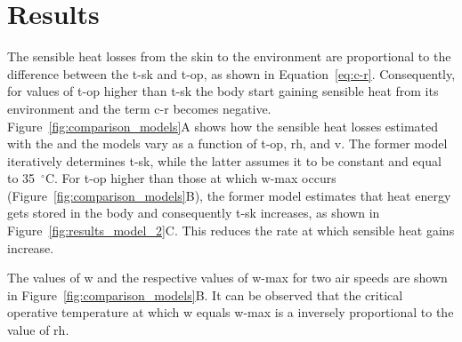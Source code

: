 

\section{Results}\label{sec:results}

The sensible heat losses from the skin to the environment are proportional to the difference between the \ac{t-sk} and \ac{t-op}, as shown in Equation~\ref{eq:c-r}.
Consequently, for values of \ac{t-op} higher than \ac{t-sk} the body start gaining sensible heat from its environment and the term \ac{c-r} becomes negative.
Figure~\ref{fig:comparison_models}A shows how the sensible heat losses estimated with the  and the  models vary as a function of \ac{t-op}, \ac{rh}, and \ac{v}.
The former model iteratively determines \ac{t-sk}, while the latter assumes it to be constant and equal to 35~$^{\circ}$C\@.
For \ac{t-op} higher than those at which \ac{w-max} occurs (Figure~\ref{fig:comparison_models}B), the former model estimates that heat energy gets stored in the body and consequently \ac{t-sk} increases, as shown in Figure~\ref{fig:results_model_2}C\@.
This reduces the rate at which sensible heat gains increase.

The values of \ac{w} and the respective values of \ac{w-max} for two air speeds are shown in Figure~\ref{fig:comparison_models}B\@.
It can be observed that the critical operative temperature at which \ac{w} equals \ac{w-max} is a inversely proportional to the value of \ac{rh}.

